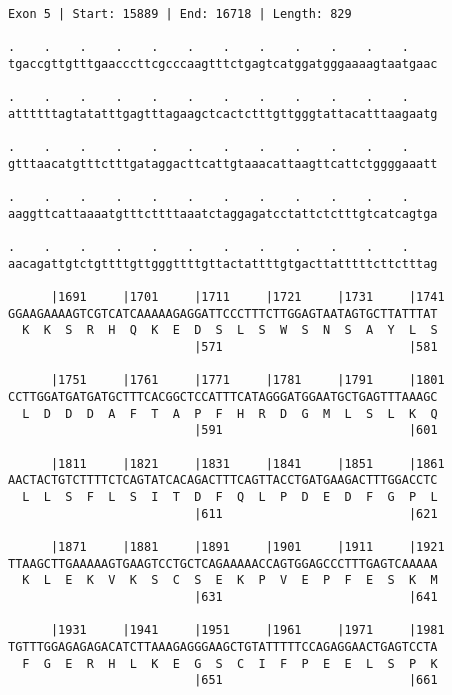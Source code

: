 \documentclass{article}
\begin{document}
\begin{Verbatim}[fontfamily=courier]
Exon 5 | Start: 15889 | End: 16718 | Length: 829

.    .    .    .    .    .    .    .    .    .    .    .    
tgaccgttgtttgaacccttcgcccaagtttctgagtcatggatgggaaaagtaatgaac

.    .    .    .    .    .    .    .    .    .    .    .    
attttttagtatatttgagtttagaagctcactctttgttgggtattacatttaagaatg

.    .    .    .    .    .    .    .    .    .    .    .    
gtttaacatgtttctttgataggacttcattgtaaacattaagttcattctggggaaatt

.    .    .    .    .    .    .    .    .    .    .    .    
aaggttcattaaaatgtttcttttaaatctaggagatcctattctctttgtcatcagtga

.    .    .    .    .    .    .    .    .    .    .    .    
aacagattgtctgttttgttgggttttgttactattttgtgacttatttttcttctttag

      |1691     |1701     |1711     |1721     |1731     |1741
GGAAGAAAAGTCGTCATCAAAAAGAGGATTCCCTTTCTTGGAGTAATAGTGCTTATTTAT
  K  K  S  R  H  Q  K  E  D  S  L  S  W  S  N  S  A  Y  L  S
                          |571                          |581

      |1751     |1761     |1771     |1781     |1791     |1801
CCTTGGATGATGATGCTTTCACGGCTCCATTTCATAGGGATGGAATGCTGAGTTTAAAGC
  L  D  D  D  A  F  T  A  P  F  H  R  D  G  M  L  S  L  K  Q
                          |591                          |601

      |1811     |1821     |1831     |1841     |1851     |1861
AACTACTGTCTTTTCTCAGTATCACAGACTTTCAGTTACCTGATGAAGACTTTGGACCTC
  L  L  S  F  L  S  I  T  D  F  Q  L  P  D  E  D  F  G  P  L
                          |611                          |621

      |1871     |1881     |1891     |1901     |1911     |1921
TTAAGCTTGAAAAAGTGAAGTCCTGCTCAGAAAAACCAGTGGAGCCCTTTGAGTCAAAAA
  K  L  E  K  V  K  S  C  S  E  K  P  V  E  P  F  E  S  K  M
                          |631                          |641

      |1931     |1941     |1951     |1961     |1971     |1981
TGTTTGGAGAGAGACATCTTAAAGAGGGAAGCTGTATTTTTCCAGAGGAACTGAGTCCTA
  F  G  E  R  H  L  K  E  G  S  C  I  F  P  E  E  L  S  P  K
                          |651                          |661

\end{Verbatim}
\newpage
\end{document}
